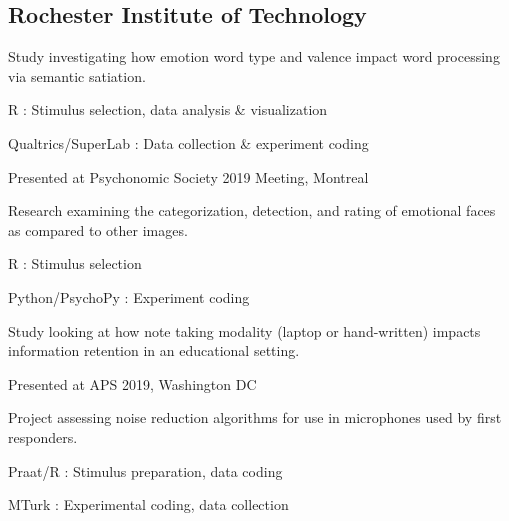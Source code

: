 \documentclass[letterpaper]{deedy-resume} %
\begin{document}
\subsection{Rochester Institute of Technology}
\begin{tightitemize}
\item Study investigating how emotion word type and valence impact word processing via semantic satiation.
\item R : Stimulus selection, data analysis \& visualization
\item Qualtrics/SuperLab : Data collection \& experiment coding
\item Presented at Psychonomic Society 2019 Meeting, Montreal
\end{tightitemize}
\sectionspace %
\pagebreak
\begin{tightitemize}
\item Research examining the categorization, detection, and rating of emotional faces as compared to other images.
\item R : Stimulus selection
\item Python/PsychoPy : Experiment coding
\end{tightitemize}
\sectionspace %
\begin{tightitemize}
\item Study looking at how note taking modality (laptop or hand-written) impacts information retention in an educational setting.
\item Presented at APS 2019, Washington DC
\end{tightitemize}
\sectionspace %
\begin{tightitemize}
\item Project assessing noise reduction algorithms for use in microphones used by first responders.
\item Praat/R : Stimulus preparation, data coding
\item MTurk : Experimental coding, data collection
\end{tightitemize}
\sectionspace %
\end{document}
